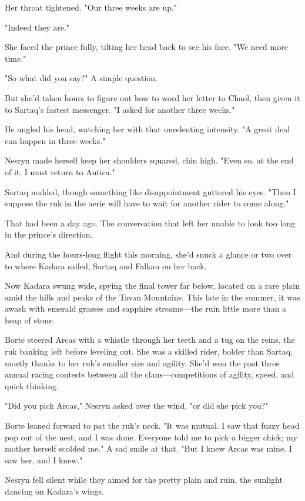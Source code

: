 Her throat tightened.
"Our three weeks are up."

"Indeed they are."

She faced the prince fully, tilting her head back to see his face.
"We need more time."

"So what did you say?"
A simple question.

But she'd taken hours to figure out how to word her letter to Chaol, then given it to Sartaq's fastest messenger.
"I asked for another three weeks."

He angled his head, watching her with that unrelenting intensity.
"A great deal can happen in three weeks."

Nesryn made herself keep her shoulders squared, chin high.
"Even so, at the end of it, I must return to Antica."

Sartaq nodded, though something like disappointment guttered his eyes.
"Then I suppose the ruk in the aerie will have to wait for another rider to come along."

That had been a day ago.
The conversation that left her unable to look too long in the prince's direction.

And during the hours-long flight this morning, she'd snuck a glance or two over to where Kadara sailed, Sartaq and Falkan on her back.

Now Kadara swung wide, spying the final tower far below, located on a rare plain amid the hills and peaks of the Tavan Mountains.
This late in the summer, it was awash with emerald grasses and sapphire streams---the ruin little more than a heap of stone.

Borte steered Arcas with a whistle through her teeth and a tug on the reins, the ruk banking left before leveling out.
She was a skilled rider, bolder than Sartaq, mostly thanks to her ruk's smaller size and agility.
She'd won the past three annual racing contests between all the clans---competitions of agility, speed, and quick thinking.

"Did you pick Arcas," Nesryn asked over the wind, "or did she pick you?"

Borte leaned forward to pat the ruk's neck.
"It was mutual.
I saw that fuzzy head pop out of the nest, and I was done.
Everyone told me to pick a bigger chick; my mother herself scolded me."
A sad smile at that.
"But I knew Arcas was mine.
I saw her, and I knew."

Nesryn fell silent while they aimed for the pretty plain and ruin, the sunlight dancing on Kadara's wings.


